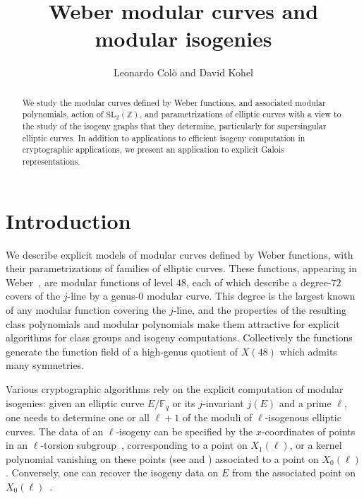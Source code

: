 \documentclass{amsart}
\makeatletter
\newcommand{\FF}{\mathbb{F}}
\newcommand{\ZZ}{\mathbb{Z}}
\newcommand{\SL}{\mathrm{SL}}
\newcommand{\reqnomode}{\tagsleft@false\let\veqno\@@eqno}
\makeatother
\begin{document}
\title{Weber modular curves and modular isogenies}
\author{Leonardo Col\`o and David Kohel}
\date{}
\reqnomode

\begin{abstract}
  We study the modular curves defined by Weber functions, and associated
  modular polynomials, action of $\SL_2(\ZZ)$, and parametrizations of
  elliptic curves with a view to the study of the isogeny graphs that
  they determine, particularly for supersingular elliptic curves.
  In addition to applications to efficient isogeny computation in
  cryptographic applications, we present an application to explicit
  Galois representations.
\end{abstract}

\maketitle

\section{Introduction}

We describe explicit models of modular curves defined by Weber functions,
with their parametrizations of families of elliptic curves.
These functions, appearing in Weber~\cite{Weber}, are modular functions
of level $48$, each of which describe a degree-$72$ covers of the
$j$-line by a genus-$0$ modular curve.
This degree is the largest known of any modular function covering the
$j$-line, and the properties of the resulting class polynomials and
modular polynomials make them attractive for explicit algorithms for
class groups and isogeny computations.  Collectively the functions
generate the function field of a high-genus quotient of $X(48)$
which admits many symmetries. 

Various cryptographic algorithms rely on the explicit computation of
modular isogenies: given an elliptic curve $E/\FF_q$ or its $j$-invariant
$j(E)$ and a prime $\ell$, one needs to determine one or all $\ell+1$
of the moduli of $\ell$-isogenous elliptic curves.
The data of an $\ell$-isogeny can be specified by the $x$-coordinates
of points in an $\ell$-torsion
subgroup~\cite{Velu71}, corresponding to a point on $X_1(\ell)$, or a
kernel polynomial vanishing on these points (see \cite[Chapter 2]{Kohel96}
and \cite{LercierMorain98}) associated to a point on $X_0(\ell)$.
Conversely, one can recover the isogeny data on $E$ from the associated
point on $X_0(\ell)$~\cite{Schoof95}.
\end{document}
